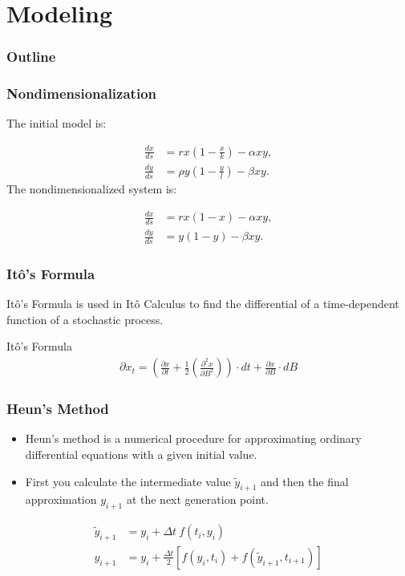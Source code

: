 \section{Modeling}

\begin{frame}
  \frametitle{Outline}
  \tableofcontents[ currentsection ]
\end{frame}

\begin{frame}
\frametitle{Nondimensionalization}

The initial model is:

  \begin{align*}
    \frac{dx}{ds} & = rx \left(1-\frac{x}{k}\right) - \alpha xy, \\
    \frac{dy}{ds} & = \rho y \left(1-\frac{y}{l}\right) - \beta xy.
  \end{align*}
The nondimensionalized system is:

	\begin{align*}
		\frac{d{x}}{ds} &= rx(1-x) - \alpha xy, \\
		\frac{d{y}}{ds} &= y(1-y) - \beta xy.
	\end{align*}
\end{frame}



\begin{frame}
\frametitle{It\^o's Formula}
It\^o's Formula is used in It\^o Calculus to find the differential of a time-dependent function of a stochastic process.

		 \begin{block}{It\^o's Formula}
      \begin{align*}
				\partial x_t =\left(\frac{\partial x}{\partial t} + \frac{1}{2} \left(\frac{\partial ^2 x}{\partial B ^2}\right)\right) \cdot  dt + \frac{\partial x}{\partial B} \cdot dB 
			\end{align*}
    \end{block}
		
\end{frame}

\begin{frame}
\frametitle{Heun's Method}
\begin{itemize}
\item Heun's method is a numerical procedure for approximating ordinary differential equations with a given initial value.
\item First you calculate the intermediate value $\tilde{y}_{i+1}$ and then the final approximation $y_{i+1}$ at the next generation point.
\end{itemize}

\begin{align*}
	\tilde{y}_{i+1} &= y_i + \Delta t \ f(t_i, y_i) \\
	y_{i+1} &= y_i + \frac{\Delta t}{2} \left[f(y_i,t_i) + f(\tilde{y}_{i+1}, t_{i+1})\right]
\end{align*}
\end{frame}